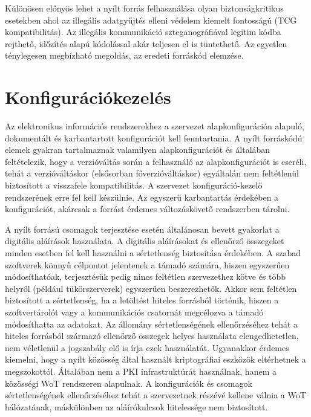 \documentclass[12pt,magyar,a4paper,oneside]{scrreprt}
\begin{document}
Különösen előnyös lehet a nyílt forrás felhasználása olyan
biztonságkritikus esetekben ahol az illegális adatgyűjtés elleni védelem
kiemelt fontosságú (TCG kompatibilitás). Az illegális kommunikáció
szteganográfiával legitim kódba rejthető, időzítés alapú kódolással akár
teljesen el is tüntethető. Az egyetlen ténylegesen megbízható megoldás,
az eredeti forráskód elemzése.

\hypertarget{konfiguruxe1ciuxf3kezeluxe9s}{%
\section{Konfigurációkezelés}\label{konfiguruxe1ciuxf3kezeluxe9s}}

Az elektronikus információs rendszerekhez a szervezet alapkonfiguráción
alapuló, dokumentált és karbantartott konfigurációt kell fenntartania. A
nyílt forráskódú elemek gyakran tartalmaznak valamilyen
alapkonfigurációt és általában feltételezik, hogy a verzióváltás során a
felhasználó az alapkonfigurációt is cseréli, tehát a verzióváltáskor
(elsősorban főverzióváltáskor) egyáltalán nem feltétlenül biztosított a
visszafele kompatibilitás. A szervezet konfiguráció-kezelő rendszerének
erre fel kell készülnie. Az egyszerű karbantartás érdekében a
konfigurációt, akárcsak a forrást érdemes változáskövető rendszerben
tárolni.

A nyílt forrású csomagok terjesztése esetén általánosan bevett gyakorlat
a digitális aláírások használata. A digitális aláírásokat és ellenőrző
összegeket minden esetben fel kell használni a sértetlenség biztosítása
érdekében. A szabad szoftverek könnyű célpontot jelentenek a támadó
számára, hiszen egyszerűen módosíthatóak, terjesztésük pedig nincs
feltétlen szervezethez kötve és több helyről (például tükörszerverek)
egyszerűen beszerezhetők. Akkor sem feltétlen biztosított a
sértetlenség, ha a letöltést hiteles forrásból történik, hiszen a
szoftvertárolót vagy a kommunikációs csatornát megcélozva a támadó
módosíthatta az adatokat. Az állomány sértetlenségének ellenőrzéséhez
tehát a hiteles forrásból származó ellenőrző összegek helyes használata
elengedhetetlen, nem véletlenül a jogszabály elő is írja ezek
használatát. Ugyanakkor érdemes kiemelni, hogy a nyílt közösség által
használt kriptográfiai eszközök eltérhetnek a megszokottól. Általában
nem a PKI infrastruktúrát használnak, hanem a közösségi WoT rendszeren
alapulnak. A konfigurációk és csomagok sértetlenségének ellenőrzéséhez
tehát a szervezetnek részévé kellene válnia a WoT hálózatának,
máskülönben az aláírókulcsok hitelessége nem biztosított.
\end{document}
